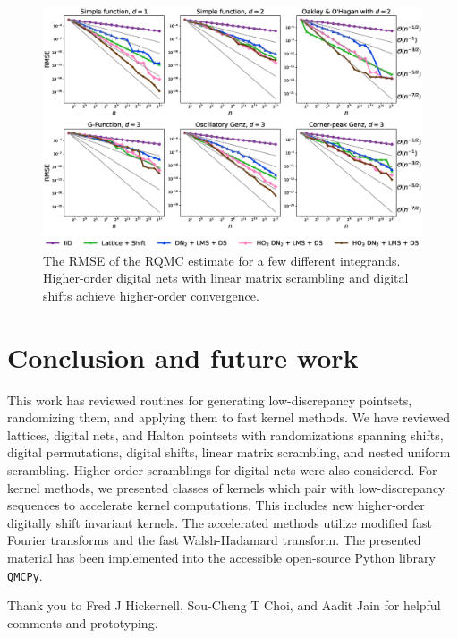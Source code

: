 \documentclass[acmsmall]{acmart}
\begin{document}
\begin{figure}%
    \centering
    \includegraphics[width=1\textwidth]{./figs/convergence.eps}
    \caption{The RMSE of the RQMC estimate for a few different integrands. Higher-order digital nets with linear matrix scrambling and digital shifts achieve higher-order convergence.}
    \Description[]{}
    \label{fig:convergence}
\end{figure}

\section{Conclusion and future work} \label{sec:conclusions_future_work}

This work has reviewed routines for generating low-discrepancy pointsets, randomizing them, and applying them to fast kernel methods. We have reviewed lattices, digital nets, and Halton pointsets with randomizations spanning shifts, digital permutations, digital shifts, linear matrix scrambling, and nested uniform scrambling. Higher-order scramblings for digital nets were also considered. For kernel methods, we presented classes of kernels which pair with low-discrepancy sequences to accelerate kernel computations. This includes new higher-order digitally shift invariant kernels. The accelerated methods utilize modified fast Fourier transforms and the fast Walsh-Hadamard transform. The presented material has been implemented into the accessible open-source Python library \texttt{QMCPy}.  

\begin{acks}
    Thank you to Fred J Hickernell, Sou-Cheng T Choi, and Aadit Jain for helpful comments and prototyping. 
\end{acks}
\end{document}
